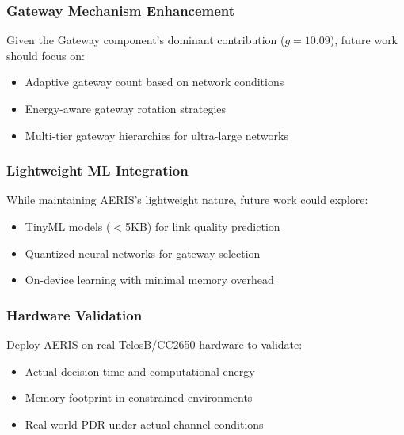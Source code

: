 \subsubsection{Gateway Mechanism Enhancement}

Given the Gateway component's dominant contribution ($g = 10.09$), future
work should focus on:
\begin{itemize}
    \item Adaptive gateway count based on network conditions
    \item Energy-aware gateway rotation strategies
    \item Multi-tier gateway hierarchies for ultra-large networks
\end{itemize}

\subsubsection{Lightweight ML Integration}

While maintaining AERIS's lightweight nature, future work could explore:
\begin{itemize}
    \item TinyML models ($<$5KB) for link quality prediction
    \item Quantized neural networks for gateway selection
    \item On-device learning with minimal memory overhead
\end{itemize}

\subsubsection{Hardware Validation}

Deploy AERIS on real TelosB/CC2650 hardware to validate:
\begin{itemize}
    \item Actual decision time and computational energy
    \item Memory footprint in constrained environments
    \item Real-world PDR under actual channel conditions
\end{itemize}
